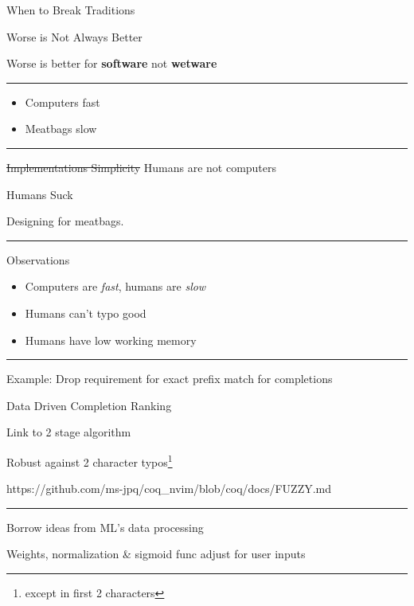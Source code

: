 \documentclass{beamer}
\begin{document}
\begin{frame}[standout]

	When to Break Traditions

\end{frame}


\begin{frame}{Worse is Not Always Better}

	Worse is better for \textbf{software} not \textbf{wetware}

	\rule{\textwidth}{0.1em}

	\begin{itemize}

		\item Computers fast

		\item Meatbags slow

	\end{itemize}

	\rule{\textwidth}{0.1em}

	\st{Implementations Simplicity} Humans are not computers

\end{frame}


\begin{frame}{Humans Suck}

	Designing for meatbags.

	\rule{\textwidth}{0.1em}

	\begin{block}{Observations}

		\begin{itemize}

			\item Computers are \textit{fast}, humans are \textit{slow}

			\item Humans can't typo good

			\item Humans have low working memory

		\end{itemize}

	\end{block}

	\rule{\textwidth}{0.1em}

	Example: Drop requirement for exact prefix match for completions

\end{frame}


\begin{frame}{Data Driven Completion Ranking}


	Link to 2 stage algorithm

	Robust against 2 character typos\footnote{except in first 2 characters}

	https://github.com/ms-jpq/coq\_nvim/blob/coq/docs/FUZZY.md

	\rule{\textwidth}{0.1em}

	Borrow ideas from ML's data processing

	Weights, normalization \& sigmoid func adjust for user inputs

\end{frame}
\end{document}
